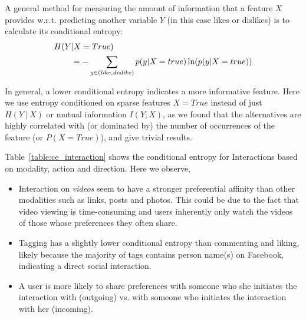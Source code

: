 A general method for measuring the amount of information that a 
feature $X$ provides w.r.t. predicting another variable $Y$ (in this
case likes or dislikes) is to calculate its conditional entropy:
\begin{align*}
H(Y&|X=True)\\
& = -\sum_{y\in{(\like,\dislike)}} p(y|X=true) \ln( p(y|X=true))
\end{align*}

In general, a lower conditional entropy indicates a more informative
feature. Here we use entropy conditioned on sparse features $X=True$ 
instead of just $H(Y~|~X)$ or mutual information $I(Y; X)$, as we found 
that the alternatives are highly correlated with (or dominated by) the number of 
occurrences of the feature (or $P(X=True)$), and give trivial results. 

Table~\ref{table:ce_interaction} shows the conditional entropy for Interactions based on modality, action and direction. Here we observe,
\begin{itemize}
\item Interaction on {\em videos} seem to have a stronger preferential affinity 
than other modalities such as links, posts and photos.  This could be
  due to the fact that video viewing is time-consuming and users
  inherently only watch the videos of those whose preferences they
  often share.
\item Tagging has a slightly lower conditional entropy than
  commenting and liking, likely because the majority of tags contains 
  person name(s) on Facebook, indicating a direct social interaction. 
\item A user is more likely to share preferences with someone who she
  initiates the interaction with (outgoing) vs. with someone who
  initiates the interaction with her (incoming).  
\end{itemize}

